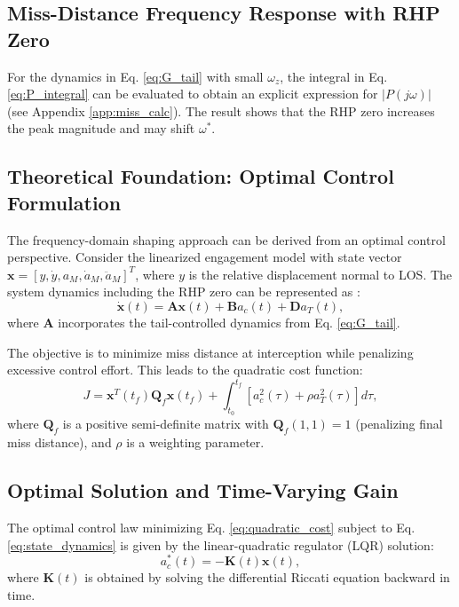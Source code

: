 \documentclass[11pt,a4paper]{article}
\begin{document}
\subsection{Miss-Distance Frequency Response with RHP Zero}
For the dynamics in Eq. \eqref{eq:G_tail} with small $\omega_z$, the integral in Eq. \eqref{eq:P_integral} can be evaluated to obtain an explicit expression for $|P(j\omega)|$ (see Appendix \ref{app:miss_calc}). The result shows that the RHP zero increases the peak magnitude and may shift $\omega^*$.

\subsection{Theoretical Foundation: Optimal Control Formulation}
The frequency-domain shaping approach can be derived from an optimal control perspective. Consider the linearized engagement model with state vector $\mathbf{x} = [y, \dot{y}, a_M, \dot{a}_M, \ddot{a}_M]^T$, where $y$ is the relative displacement normal to LOS. The system dynamics including the RHP zero can be represented as \cite{Zarchan2002}:
\begin{equation}
\dot{\mathbf{x}}(t) = \mathbf{A} \mathbf{x}(t) + \mathbf{B} a_c(t) + \mathbf{D} a_T(t),
\label{eq:state_dynamics}
\end{equation}
where $\mathbf{A}$ incorporates the tail-controlled dynamics from Eq. \eqref{eq:G_tail}.

The objective is to minimize miss distance at interception while penalizing excessive control effort. This leads to the quadratic cost function:
\begin{equation}
J = \mathbf{x}^T(t_f) \mathbf{Q}_f \mathbf{x}(t_f) + \int_{t_0}^{t_f} [a_c^2(\tau) + \rho a_T^2(\tau)] d\tau,
\label{eq:quadratic_cost}
\end{equation}
where $\mathbf{Q}_f$ is a positive semi-definite matrix with $\mathbf{Q}_f(1,1) = 1$ (penalizing final miss distance), and $\rho$ is a weighting parameter.

\subsection{Optimal Solution and Time-Varying Gain}
The optimal control law minimizing Eq. \eqref{eq:quadratic_cost} subject to Eq. \eqref{eq:state_dynamics} is given by the linear-quadratic regulator (LQR) solution:
\begin{equation}
a_c^*(t) = -\mathbf{K}(t) \mathbf{x}(t),
\label{eq:optimal_control}
\end{equation}
where $\mathbf{K}(t)$ is obtained by solving the differential Riccati equation backward in time.
\end{document}
